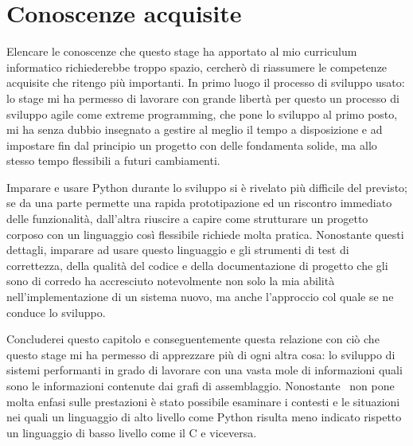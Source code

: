\section{Conoscenze acquisite}
Elencare le conoscenze che questo stage ha apportato
al mio curriculum informatico richiederebbe troppo spazio,
cercherò di riassumere le competenze acquisite che ritengo più
importanti. In primo luogo il processo di sviluppo usato: lo stage
mi ha permesso di lavorare con grande libertà per questo
un processo di sviluppo agile come extreme programming, 
che pone lo sviluppo al primo posto, mi ha senza dubbio
insegnato a gestire al meglio il tempo a disposizione e ad impostare
fin dal principio un progetto con delle fondamenta solide, ma allo stesso
tempo flessibili a futuri cambiamenti.

Imparare e usare Python durante lo sviluppo si è rivelato più
difficile del previsto; se da una parte permette una rapida prototipazione
ed un riscontro immediato delle funzionalità, dall'altra riuscire a
capire come strutturare un progetto corposo con un linguaggio
così flessibile richiede molta pratica. Nonostante questi
dettagli, imparare ad usare questo linguaggio e gli strumenti
di test di correttezza,  della qualità del codice e della documentazione
di progetto che gli sono di corredo ha accresciuto notevolmente
non solo la mia abilità nell'implementazione di un sistema nuovo, ma anche
l'approccio col quale se ne conduce lo sviluppo.

Concluderei questo capitolo e conseguentemente questa relazione
con ciò che questo stage mi ha permesso di apprezzare più di
ogni altra cosa: lo sviluppo di sistemi performanti in grado di
lavorare con una vasta mole di informazioni quali sono le informazioni
contenute dai grafi di assemblaggio. Nonostante \pygfa \  non
pone molta enfasi sulle prestazioni è stato possibile
esaminare i contesti e le situazioni nei quali un linguaggio di alto
livello come Python risulta meno indicato rispetto un linguaggio
di basso livello come il C e viceversa.
